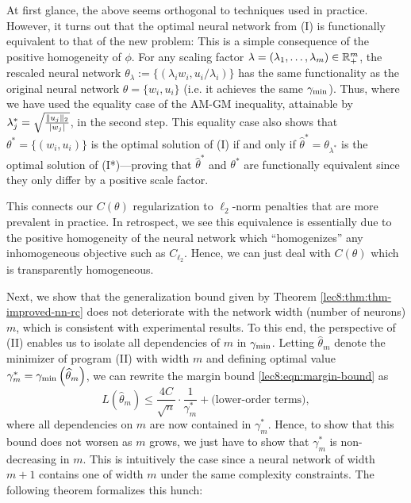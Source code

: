 At first glance, the above seems orthogonal to techniques used in practice. However, it turns out that the optimal neural network from (I) is functionally equivalent to that of the new problem:
This is a simple consequence of the positive homogeneity of $\phi$. For any scaling factor $\lambda=(\lambda_1, \dots, \lambda_m)\in \mathbb R_+^m$, the rescaled neural network $\theta_\lambda := \{(\lambda_i w_i, u_i/\lambda_i)\}$ has the same functionality as the original neural network $\theta = \{w_i, u_i \}$ (i.e. it achieves the same $\gamma_{\mathrm{min}}$). Thus, 
where we have used the equality case of the AM-GM inequality, attainable by $\lambda_j^* = \sqrt{\frac{\|u_j\|_2}{|w_j|}}$, in the second step. This equality case also shows that $\theta^* = \{(w_i, u_i ) \}$ is the optimal solution of (I) if and only if $\hat{\theta}^* = \theta_{\lambda^*}$ is the optimal solution of (I*)---proving that $\hat{\theta}^*$ and $\theta^*$ are functionally equivalent since they only differ by a positive scale factor. 

This connects our $C(\theta)$ regularization to $\ell_2$-norm penalties that are more prevalent in practice. In retrospect, we see this equivalence is essentially due to the positive homogeneity of the neural network which ``homogenizes'' any inhomogeneous objective such as $C_{\ell_2}$. Hence, we can just deal with $C(\theta)$ which is transparently homogeneous.


Next, we show that the generalization bound given by Theorem \ref{lec8:thm:thm-improved-nn-rc} does not deteriorate with the network width (number of neurons) $m$, which is consistent with experimental results. To this end, the perspective of (II) enables us to isolate all dependencies of $m$ in $\gamma_{\mathrm{min}}$. Letting $\widehat \theta_m$ denote the minimizer of program (II) with width $m$ and defining optimal value $\gamma_m^* = \gamma_{\mathrm{min}}\left(\widehat \theta_m\right)$, we can rewrite the margin bound \eqref{lec8:eqn:margin-bound} as 
\begin{equation}
L(\widehat \theta_m) \le \frac{4C}{\sqrt{n}} \cdot \frac{1}{\gamma_m^*} + \text{(lower-order terms)},
\end{equation}
where all dependencies on $m$ are now contained in $\gamma_m^*$. Hence, to show that this bound does not worsen as $m$ grows, we just have to show that $\gamma_m^*$ is non-decreasing in $m$. This is intuitively the case since a neural network of width $m+1$ contains one of width $m$ under the same complexity constraints. The following theorem formalizes this hunch:

